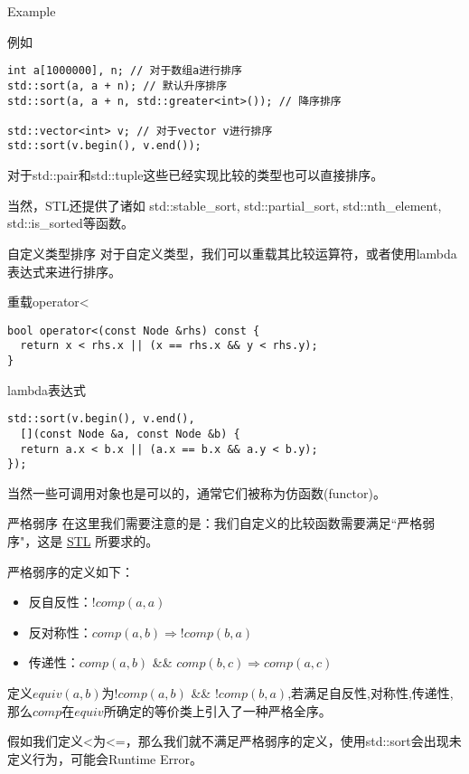 \documentclass{ldr-simple-gray}
\begin{document}
  \begin{frame}[fragile]{Example}
    \begin{block}{例如}
      \begin{verbatim}
int a[1000000], n; // 对于数组a进行排序
std::sort(a, a + n); // 默认升序排序
std::sort(a, a + n, std::greater<int>()); // 降序排序

std::vector<int> v; // 对于vector v进行排序
std::sort(v.begin(), v.end());\end{verbatim}
    \end{block}
    对于std::pair和std::tuple这些已经实现比较的类型也可以直接排序。
    \newline

    当然，STL还提供了诸如 std::stable\_sort, std::partial\_sort, std::nth\_element, std::is\_sorted等函数。
  \end{frame}

  \begin{frame}[fragile]{自定义类型排序}
    对于自定义类型，我们可以重载其比较运算符，或者使用lambda表达式来进行排序。
    \begin{block}{重载operator<}
      \begin{verbatim}
bool operator<(const Node &rhs) const {
  return x < rhs.x || (x == rhs.x && y < rhs.y);
}\end{verbatim}
    \end{block}
    \begin{block}{lambda表达式}
      \begin{verbatim}
std::sort(v.begin(), v.end(),
  [](const Node &a, const Node &b) {
  return a.x < b.x || (a.x == b.x && a.y < b.y);
});\end{verbatim}
    \end{block}
    
    当然一些可调用对象也是可以的，通常它们被称为仿函数(functor)。
  \end{frame}

  \begin{frame}{严格弱序}
    在这里我们需要注意的是：我们自定义的比较函数需要满足``严格弱序"，这是 \href{https://zh.cppreference.com/w/cpp/named_req/Compare}{STL} 所要求的。

    \begin{block}{严格弱序的定义如下：}
      \begin{itemize}
        \item 反自反性：$!comp(a, a)$
        \item 反对称性：$comp(a, b) \Rightarrow !comp(b, a)$
        \item 传递性：$comp(a, b)$ \&\& $comp(b, c) \Rightarrow comp(a, c)$
      \end{itemize}
    \end{block}

    定义$equiv(a, b)$为$!comp(a, b)$ \&\& $!comp(b, a)$,若满足自反性,对称性,传递性,那么$comp$在$equiv$所确定的等价类上引入了一种严格全序。\newline

    假如我们定义<为<=，那么我们就不满足严格弱序的定义，使用std::sort会出现未定义行为，可能会Runtime Error。
  \end{frame}
\end{document}
